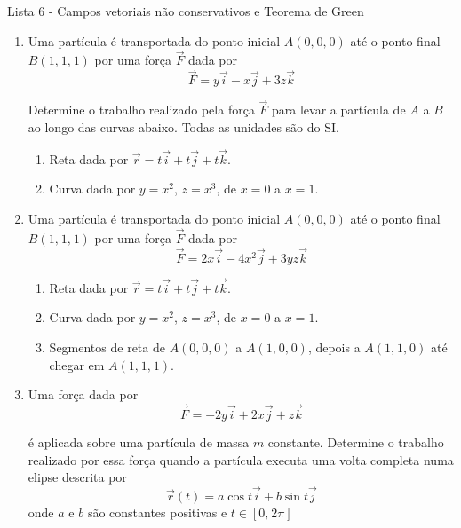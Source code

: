 \documentclass[11pt,a4paper]{article}
\begin{document}
	\begin{center}
		\Large Lista 6 - Campos vetoriais não conservativos e Teorema de Green
	\end{center}
	

	\begin{enumerate}
	
	\item Uma partícula é transportada do ponto inicial $A(0 \textrm{,}\ 0 \textrm{,}\ 0)$ até o ponto final $B(1 \textrm{,}\ 1 \textrm{,}\ 1)$ por uma força $\vec{F}$ dada por
  $$\vec{F} = y\vec{i} - x\vec{j} + 3z\vec{k}$$
  
  Determine o trabalho realizado pela força $\vec{F}$ para levar a partícula de $A$ a $B$ ao longo das curvas abaixo. Todas as unidades são do SI.
  
      \begin{enumerate}[label=(\roman*)]
       \item Reta dada por $\vec{r} = t\vec{i} + t\vec{j} + t\vec{k}$.
       \item Curva dada por $y = x^2$, $z = x^3$, de $x = 0$ a $x = 1$.
      \end{enumerate}
 
	\item Uma partícula é transportada do ponto inicial $A(0 \textrm{,}\ 0 \textrm{,}\ 0)$ até o ponto final $B(1 \textrm{,}\ 1 \textrm{,}\ 1)$ por uma força $\vec{F}$ dada por
  $$\vec{F} = 2x\vec{i} - 4x^2\vec{j} + 3yz\vec{k}$$
  
  \begin{enumerate}[label=(\roman*)]
       \item Reta dada por $\vec{r} = t\vec{i} + t\vec{j} + t\vec{k}$.
       \item Curva dada por $y = x^2$, $z = x^3$, de $x = 0$ a $x = 1$.
       \item Segmentos de reta de $A(0 \textrm{,}\ 0 \textrm{,}\ 0)$ a $A(1 \textrm{,}\ 0 \textrm{,}\ 0)$, depois a $A(1 \textrm{,}\ 1 \textrm{,}\ 0)$ até chegar em $A(1 \textrm{,}\ 1 \textrm{,}\ 1)$.
      \end{enumerate}
      
	\item Uma força dada por 
	$$\vec{F} = -2y \vec{i} + 2x\vec{j} + z\vec{k}$$ 
	
	é aplicada sobre uma partícula de massa $m$ constante. Determine o trabalho realizado por essa força quando a partícula executa uma volta completa numa elipse descrita por 
	$$\vec{r}(t) = a\cos t\vec{i} + b\sin t\vec{j}$$ 
	onde $a$ e $b$ são constantes positivas e $t \in [0 \textrm{,}\ 2\pi]$
	

\end{enumerate}
\end{document}
